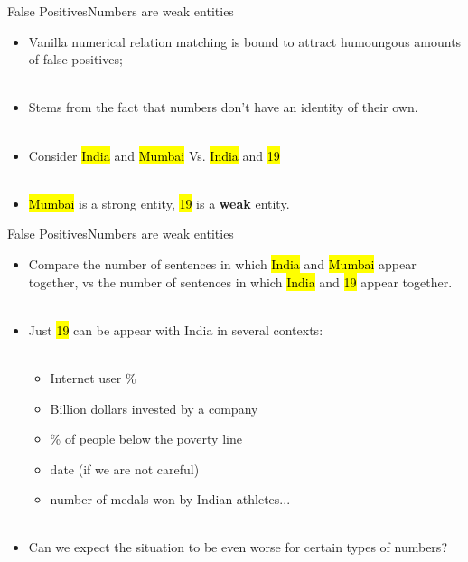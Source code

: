 \documentclass{beamer}
\makeatletter
\newcommand\SoulColor{%
  \let\set@color\beamerorig@set@color
  \let\reset@color\beamerorig@reset@color}
\makeatother
\begin{document}
\begin{frame}{False Positives}{Numbers are weak entities}
\begin{itemize}
 \item Vanilla numerical relation matching is bound to attract humoungous amounts of false positives; \pause \\~\\
 \item Stems from the fact that numbers don't have an identity of their own. \pause \\~\\
 \item Consider {\SoulColor\hl{India}} and {\SoulColor\hl{Mumbai}} Vs. {\SoulColor\hl{India}} and {\SoulColor\hl{19}} \pause \\~\\
 \item {\SoulColor\hl{Mumbai}} is a strong entity, {\SoulColor\hl{19}} is a \textbf{weak} entity. 
 \end{itemize}
\end{frame}
\begin{frame}{False Positives}{Numbers are weak entities}
 \begin{itemize}  
 \item Compare the number of sentences in which {\SoulColor\hl{India}} and {\SoulColor\hl{Mumbai}} appear together, vs the number of sentences
  in which {\SoulColor\hl{India}} and {\SoulColor\hl{19}} appear together. \pause \\~\\
 \item Just {\SoulColor\hl{19}} can be appear with India in several contexts: \pause \\~\\
 \begin{itemize} 
 \item Internet user \% \pause 
 \item Billion dollars invested by a company \pause 
 \item \% of people below the poverty line \pause 
 \item date (if we are not careful) \pause 
 \item number of medals won by Indian athletes... \pause \\~\\
\end{itemize} 

 \item Can we expect the situation to be even worse for certain types of numbers?
\end{itemize}
\end{frame}
\end{document}
